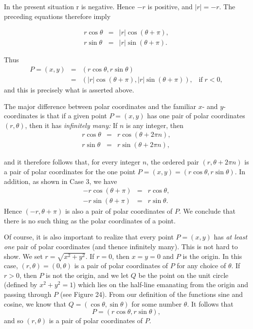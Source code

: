 
\noindent In the present situation r is negative. Hence $-r$ is positive, and $|r| = -r$. The preceding equations therefore imply 

\begin{eqnarray*}
r \cos \theta &=& |r| \cos(\theta + \pi), \\
r \sin \theta &=& |r| \sin(\theta + \pi).
\end{eqnarray*}

\noindent Thus
\begin{eqnarray*}  
P = (x, y) &=& (r \cos \theta, r \sin \theta) \\
               &=& (|r| \cos(\theta + \pi), |r| \sin(\theta + \pi)),  \;\;\;\mbox{if}\; r < 0,
\end{eqnarray*}
\noindent and this is precisely what is asserted above.
 
The major difference between polar coordinates and the familiar $x$- and $y$-coordinates is that if a given point $P = (x, y)$ has one pair of polar coordinates $(r, \theta)$, then it has \textit{infinitely many:} If $n$ is any integer, then
\begin{eqnarray*}
r \cos \theta &=& r \cos(\theta + 2\pi n), \\
r \sin \theta &=& r \sin (\theta + 2\pi n),
\end{eqnarray*}

\noindent and it therefore follows that, for every integer $n$, the ordered pair $(r, \theta + 2\pi n)$ is a pair of polar coordinates for the one point $P = (x, y) = (r \cos \theta, r \sin \theta)$. In addition, as shown in Case 3, we have
\begin{eqnarray*}
-r \cos(\theta + \pi) &=& r \cos \theta, \\
-r \sin(\theta + \pi) &=& r \sin \theta.
\end{eqnarray*}
\noindent Hence $(-r, \theta + \pi)$ is also a pair of polar coordinates of $P$. We conclude that there is no such thing as the polar coordinates of a point.


Of course, it is also important to realize that every point $P = (x, y)$ has \textit{at least one} pair of polar coordinates (and thence infinitely many). This is not hard to show. We set $r = \sqrt{x^2 + y^2}$. If $r = 0$, then $x = y = 0$ and $P$ is the origin. In this case, $(r, \theta) = (0, \theta)$ is a pair of polar coordinates of $P$ for any choice of $\theta$. If $r > 0$, then $P$ is not the origin, and we let $Q$ be the point on the unit circle (defined by $x^2 + y^2 = 1$) which lies on the half-line emanating from the origin and passing through $P$ (see Figure 24). From our definition of the functions sine and cosine, we know that $Q = (\cos \theta, \sin \theta)$ for some number $\theta$. It follows that
$$
P = (r \cos \theta, r \sin \theta),
$$
\noindent and so $(r, \theta)$ is a pair of polar coordinates of $P$.

